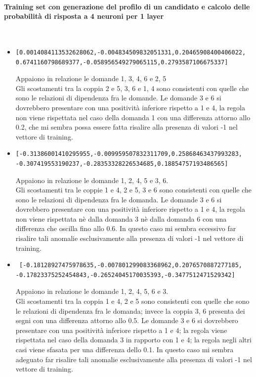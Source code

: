 \paragraph{Training set con generazione del profilo di un candidato e calcolo delle probabilit\`a di risposta a 4 neuroni per 1 layer}\mbox{}
\label{Training set con generazione del profilo di un candidato e calcolo delle probabilita di risposta a 4 neuroni per 1 layer}
\\
\noindent
\begin{itemize}
\item \begin{verbatim}[0.0014084113532628062,-0.004834509832051331,0.20465908400406022,
0.6741160798689377,-0.058956549279065115,0.2793587106675337]
\end{verbatim}
Appaiono in relazione le domande 1, 3, 4, 6 e 2, 5\\
Gli scostamenti tra la coppia 2 e 5,  3, 6 e 1, 4 sono consistenti con quelle che sono le relazioni di dipendenza fra le domande.
Le domande 3 e 6 si dovrebbero presentare con una positivit\`a inferiore rispetto a 1 e 4, la regola non viene rispettata nel caso della domanda 1 con una differenza attorno allo 0.2, che mi sembra possa essere fatta risalire alla presenza di valori -1 nel vettore di training.

\item \begin{verbatim}[-0.31386001410295955,-0.009959507832311709,0.25868463437993283,
-0.307419553190237,-0.28353328226534685,0.18854757193486565]
\end{verbatim}
Appaiono in relazione le domande 1, 2, 4, 5 e 3, 6.\\
Gli scostamenti tra le coppie 1 e 4, 2 e 5, 3 e 6 sono consistenti con quelle che sono le relazioni di dipendenza fra le domanda.
Le domande 3 e 6 si dovrebbero presentare con una positivit\`a inferiore rispetto a 1 e 4, la regola non viene rispettata n\`e dalla domanda 3 n\`e dalla domanda 6 con una differenza che oscilla fino allo 0.6. In questo caso mi sembra eccessivo far risalire tali anomalie esclusivamente alla presenza di valori -1 nel vettore di training.

\item \begin{verbatim} [-0.18128927475978635,-0.007801299083368962,0.2076570887277185,
-0.17823375252454843,-0.26524045170035393,-0.3477512471529342]
\end{verbatim}
Appaiono in relazione le domande 1, 2, 4, 5, 6 e 3.\\
Gli scostamenti tra la coppia 1 e 4, 2 e 5 sono consistenti con quelle che sono le relazioni di dipendenza fra le domanda; invece la coppia 3, 6 presenta dei segni con una differenza attorno allo 0.5.
Le domande 3 e 6 si dovrebbero presentare con una positivit\`a inferiore rispetto a 1 e 4; la regola viene rispettata nel caso della domanda 3 in rapporto con 1 e 4; la regola negli altri casi viene sfasata per una differenza dello 0.1. In questo caso  mi sembra adeguato far risalire tali anomalie esclusivamente alla presenza di valori -1 nel vettore di training. 



\end{itemize}
